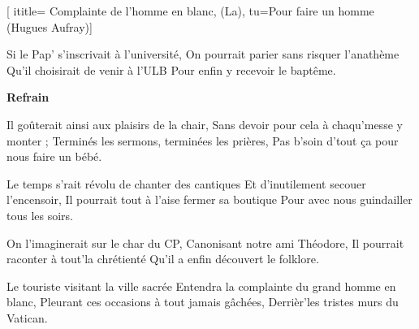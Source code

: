  [
ititle= {Complainte de l'homme en blanc, (La)},
tu={Pour faire un homme (Hugues Aufray)}]

\beginverse
Si le Pap' s'inscrivait à l'université,
On pourrait parier sans risquer l'anathème
Qu'il choisirait de venir à l'ULB
Pour enfin y recevoir le baptême.
\endverse

\beginchorus
\textbf {Refrain}
\endchorus

\beginverse
Il goûterait ainsi aux plaisirs de la chair,
Sans devoir pour cela à chaqu'messe y monter ;
Terminés les sermons, terminées les prières,
Pas b'soin d'tout ça pour nous faire un bébé.
\endverse

\beginverse
Le temps s'rait révolu de chanter des cantiques
Et d'inutilement secouer l'encensoir,
Il pourrait tout à l'aise fermer sa boutique
Pour avec nous guindailler tous les soirs.
\endverse

\beginverse
On l'imaginerait sur le char du CP,
Canonisant notre ami Théodore,
Il pourrait raconter à tout'la chrétienté
Qu'il a enfin découvert le folklore.
\endverse

\beginverse
Le touriste visitant la ville sacrée
Entendra la complainte du grand homme en blanc,
Pleurant ces occasions à tout jamais gâchées,
Derrièr'les tristes murs du Vatican.
\endverse

\endsong
